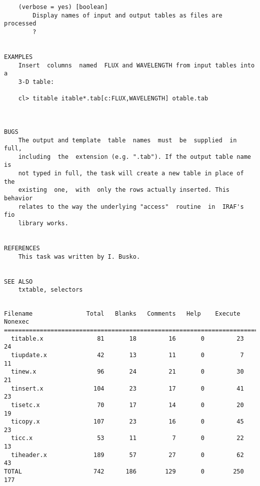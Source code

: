 \begin{verbatim}
    (verbose = yes) [boolean]
        Display names of input and output tables as files are  processed
        ?
    
    
EXAMPLES
    Insert  columns  named  FLUX and WAVELENGTH from input tables into a
    3-D table:
    
    cl> titable itable*.tab[c:FLUX,WAVELENGTH] otable.tab
    
    
    
BUGS
    The output and template  table  names  must  be  supplied  in  full,
    including  the  extension (e.g. ".tab"). If the output table name is
    not typed in full, the task will create a new table in place of  the
    existing  one,  with  only the rows actually inserted. This behavior
    relates to the way the underlying "access"  routine  in  IRAF's  fio
    library works.
    
    
REFERENCES
    This task was written by I. Busko.
    
    
SEE ALSO
    txtable, selectors
\end{verbatim}
\newpage
{}
\begin{verbatim}

Filename               Total   Blanks   Comments   Help    Execute   Nonexec
============================================================================
  titable.x               81       18         16       0         23       24
  tiupdate.x              42       13         11       0          7       11
  tinew.x                 96       24         21       0         30       21
  tinsert.x              104       23         17       0         41       23
  tisetc.x                70       17         14       0         20       19
  ticopy.x               107       23         16       0         45       23
  ticc.x                  53       11          7       0         22       13
  tiheader.x             189       57         27       0         62       43
TOTAL                    742      186        129       0        250      177
\end{verbatim}
\newpage
{}
